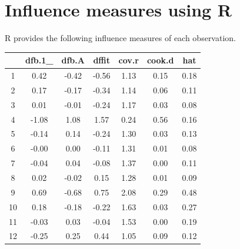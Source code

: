 \documentclass[12pt, a4paper]{report}
\theoremstyle{plain}
\theoremstyle{definition}
\theoremstyle{remark}
\begin{document}
	
	
	\section{Influence measures using R}
	R provides the following influence measures of each observation.
	
	
	\begin{table}[ht]
		\begin{center}
			\begin{tabular}{|c|c|c|c|c|c|c|}
				\hline
				& dfb.1\_ & dfb.A & dffit & cov.r & cook.d & hat \\
				\hline
				1 & 0.42 & -0.42 & -0.56 & 1.13 & 0.15 & 0.18 \\
				2 & 0.17 & -0.17 & -0.34 & 1.14 & 0.06 & 0.11 \\
				3 & 0.01 & -0.01 & -0.24 & 1.17 & 0.03 & 0.08 \\
				4 & -1.08 & 1.08 & 1.57 & 0.24 & 0.56 & 0.16 \\
				5 & -0.14 & 0.14 & -0.24 & 1.30 & 0.03 & 0.13 \\
				6 & -0.00 & 0.00 & -0.11 & 1.31 & 0.01 & 0.08 \\
				7 & -0.04 & 0.04 & -0.08 & 1.37 & 0.00 & 0.11 \\
				8 & 0.02 & -0.02 & 0.15 & 1.28 & 0.01 & 0.09 \\
				9 & 0.69 & -0.68 & 0.75 & 2.08 & 0.29 & 0.48 \\
				10 & 0.18 & -0.18 & -0.22 & 1.63 & 0.03 & 0.27 \\
				11 & -0.03 & 0.03 & -0.04 & 1.53 & 0.00 & 0.19 \\
				12 & -0.25 & 0.25 & 0.44 & 1.05 & 0.09 & 0.12 \\
				\hline
			\end{tabular}
		\end{center}
	\end{table}
	
	
	
	
	
	
	
\end{document}
